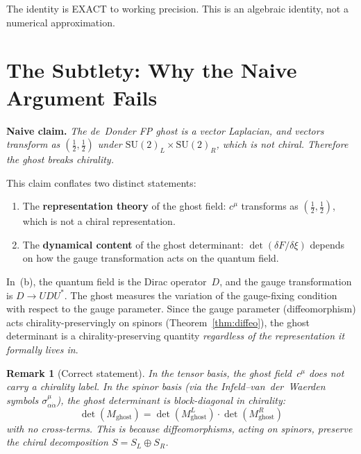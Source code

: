 \documentclass[11pt,a4paper]{article}
\newtheorem{remark}[theorem]{Remark}
\begin{document}
\noindent
The identity is EXACT to working precision.  This is an algebraic
identity, not a numerical approximation.

\section{The Subtlety: Why the Naive Argument Fails}
\label{sec:subtlety}

\noindent\textbf{Naive claim.}
\textit{The de~Donder FP ghost is a vector Laplacian, and vectors
transform as $(\tfrac{1}{2}, \tfrac{1}{2})$ under
$\mathrm{SU}(2)_L \times \mathrm{SU}(2)_R$, which is not chiral.
Therefore the ghost breaks chirality.}

\medskip
This claim conflates two distinct statements:
\begin{enumerate}[label=(\alph*)]
  \item The \textbf{representation theory} of the ghost field:
    $c^\mu$ transforms as $(\tfrac{1}{2}, \tfrac{1}{2})$, which
    is not a chiral representation.
  \item The \textbf{dynamical content} of the ghost determinant:
    $\det(\delta F / \delta\xi)$ depends on how the gauge
    transformation acts on the quantum field.
\end{enumerate}

In~(b), the quantum field is the Dirac operator~$D$, and the gauge
transformation is $D \to UDU^*$.  The ghost measures the variation
of the gauge-fixing condition with respect to the gauge parameter.
Since the gauge parameter (diffeomorphism) acts
chirality-preservingly on spinors (Theorem~\ref{thm:diffeo}),
the ghost determinant is a chirality-preserving quantity
\emph{regardless of the representation it formally lives in}.

\begin{remark}[Correct statement]
In the tensor basis, the ghost field~$c^\mu$ does not carry a
chirality label.  In the spinor basis (via the Infeld--van~der~Waerden
symbols $\sigma^\mu_{\alpha\dot\alpha}$), the ghost determinant
is block-diagonal in chirality:
\begin{equation}\label{eq:ghost-factorize}
  \det(M_{\mathrm{ghost}})
  = \det(M_{\mathrm{ghost}}^L) \cdot \det(M_{\mathrm{ghost}}^R)
\end{equation}
with no cross-terms.  This is because diffeomorphisms, acting on
spinors, preserve the chiral decomposition $S = S_L \oplus S_R$.
\end{remark}
\end{document}
